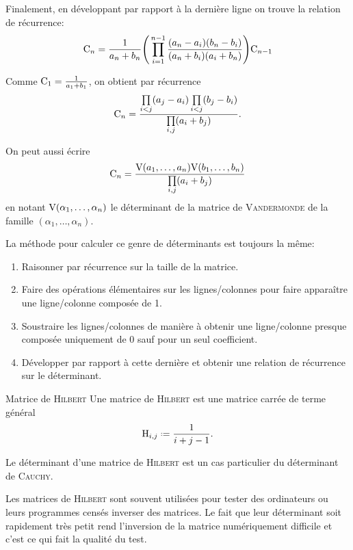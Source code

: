 \begin{preuve}
    Finalement, en développant par rapport à la dernière ligne on trouve la relation de récurrence:
    $$\mathrm{C}_n =  \frac{1}{a_n + b_n} \Bigg( \prod\limits_{i = 1}^{n-1}\frac{(a_n - a_i)(b_n - b_i)}{(a_n + b_i)(a_i + b_n)} \Bigg) \mathrm{C}_{n-1}$$
    
    Comme $\mathrm{C}_1 = \frac{1}{a_1+b_1}$, on obtient par récurrence
    $$\mathrm{C}_n = \frac{\prod\limits_{i<j}(a_j-a_i) \prod\limits_{i<j}(b_j-b_i)}{\prod\limits_{i,j}(a_i+b_j)}.$$
\end{preuve}

\begin{remarque}
    On peut aussi écrire
    $$\mathrm{C}_n = \frac{\mathrm{V}(a_1, \dots, a_n) \mathrm{V}(b_1, \dots, b_n)}{\prod\limits_{i,j}(a_i+b_j)}$$
    en notant $\mathrm{V}(\alpha_1, \dots, \alpha_n)$ le déterminant de la matrice de \textsc{Vandermonde} de la famille $(\alpha_1, \dots, \alpha_n)$.
\end{remarque}

\begin{methode}
    La méthode pour calculer ce genre de déterminants  est toujours la même: 
    \begin{enumerate}
        \item Raisonner par récurrence sur la taille de la matrice.
        \item Faire des opérations élémentaires sur les lignes/colonnes pour faire apparaître une ligne/colonne composée de 1. 
        \item Soustraire les lignes/colonnes de manière à obtenir une ligne/colonne presque composée uniquement de 0 sauf pour un seul coefficient. 
        \item Développer par rapport à cette dernière et obtenir une relation de récurrence sur le déterminant. 
    \end{enumerate}
\end{methode}

\begin{defi}{Matrice de \textsc{Hilbert}}
    Une matrice de \textsc{Hilbert} est une matrice carrée de terme général
    $$\Hilb_{i,j} \defeq {\frac {1}{i+j-1}}.$$
\end{defi}

\begin{remarque}
    Le déterminant d'une matrice de \textsc{Hilbert} est un cas particulier du déterminant de \textsc{Cauchy}.
\end{remarque}

\begin{remarque}
    Les matrices de \textsc{Hilbert} sont souvent utilisées pour tester des ordinateurs ou leurs programmes censés inverser des matrices. Le fait que leur déterminant soit rapidement très petit rend l'inversion de la matrice numériquement difficile et c'est ce qui fait la qualité du test. 
\end{remarque}
